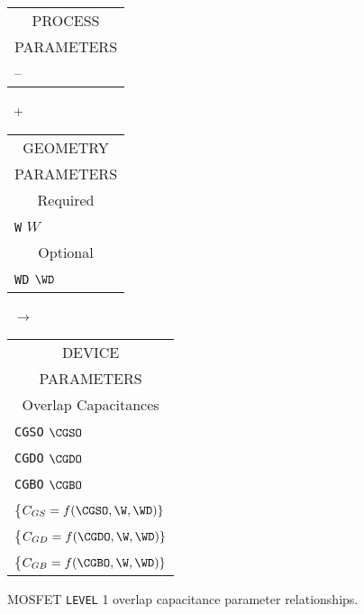 {\begin{figure}[hb]
\parbox[t]{1.3in}{
\begin{tabular}[t]{|p{1in}|}
\hline
\multicolumn{1}{|c|}{PROCESS} \\
\multicolumn{1}{|c|}{PARAMETERS} \\
\hline \hline
\hspace*{\fill} -- \hspace*{\fill}\\
\hline
\end{tabular}
} \hfill
\parbox{0.1in}{\ \vspace*{0.2in}\newline +}
\hfill
\begin{tabular}[t]{|p{1in}|}
\hline
\multicolumn{1}{|c|}{GEOMETRY} \\
\multicolumn{1}{|c|}{PARAMETERS} \\
\hline \hline
\multicolumn{1}{|c|}{Required} \\
\hline
{\tt W} \hfill $W$ \\
\hline \hline
\multicolumn{1}{|c|}{Optional} \\
\hline
{\tt WD} \hfill $\WD$ \\
\hline
\end{tabular}
\hfill
\parbox{0.1in}{\ \vspace*{0.2in}\newline $\rightarrow$}
\hfill
\begin{tabular}[t]{|p{1.8in}|}
\hline
\multicolumn{1}{|c|}{DEVICE} \\
\multicolumn{1}{|c|}{PARAMETERS} \\
\hline \hline
\multicolumn{1}{|c|}{Overlap Capacitances}\\
\hline
{\tt CGSO} \hfill $\CGSO$\\
{\tt CGDO} \hfill $\CGDO$\\
{\tt CGBO} \hfill $\CGBO$\\
\hspace*{\fill}\{$C_{GS} = f(\CGSO, \W, \WD)\}$\\
\hspace*{\fill}\{$C_{GD} = f(\CGDO, \W, \WD)\}$\\
\hspace*{\fill}\{$C_{GB} = f(\CGBO, \W, \WD)\}$\\
\hline
\end{tabular}
\caption{ MOSFET {\tt LEVEL} 1 overlap capacitance parameter
relationships. \label{mlevel1overlap}}
\end{figure}}
\vshift {} 
